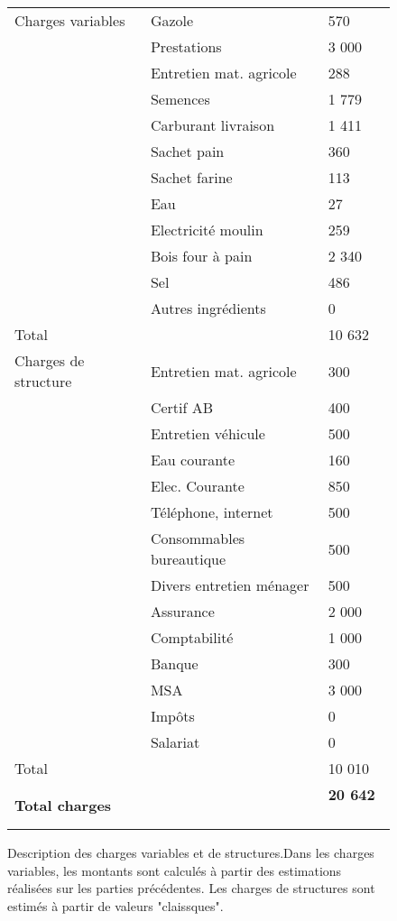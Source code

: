 \documentclass{book}
\begin{document}
\begin{figure}[h!]
\footnotesize
\center
\begin{tabular}{ | p{3cm} | p{4cm}| p{2cm}| }

\hline
	Charges variables & Gazole & 570 \\ 
	&Prestations & 3 000 \\ 
	&Entretien mat. agricole & 288   \\ 
	&Semences & 1 779 \\ 
	&Carburant livraison & 1 411\\ 
	&Sachet pain & 360   \\
	&Sachet farine & 113\\
	&Eau & 27 \\ 
	&Electricité moulin & 259 \\
	&Bois four à pain & 2 340 \\ 
	&Sel & 486 \\
	&Autres ingrédients & 0 \\ \hline
	Total &  & 10 632 \\ \hline
	\hline
	Charges de structure & Entretien mat. agricole & 300 \\
	&Certif AB & 400\\
	&Entretien véhicule & 500\\
	&Eau courante & 160\\
	&Elec. Courante & 850 \\ 
	&Téléphone, internet & 500\\
	&Consommables bureautique & 500 \\
	&Divers entretien ménager & 500\\
	&Assurance & 2 000\\ 
	&Comptabilité & 1 000 \\
	&Banque & 300\\
	&MSA & 3 000\\
	&Impôts & 0 \\
	&Salariat & 0 \\ \hline
	Total &  &10 010  \  \\ \hline
	\hline
	\textbf{Total charges} &  & \textbf{20 642} \  \\ \hline
\end{tabular}
\caption{Description des charges variables et de structures.Dans les charges variables, les montants sont calculés à partir des estimations réalisées sur les parties précédentes. Les charges de structures sont estimés à partir de valeurs "claissques".}
\label{tab:charges}
\end{figure}
\end{document}
